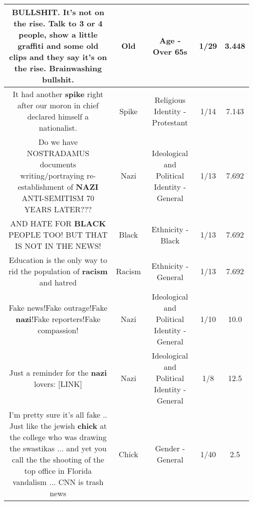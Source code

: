 \documentclass[11pt]{article}
\newlength\mylength
\begin{document}
\begin{center}
\begin{longtable}{|C{.65\mylength}|C{.30\mylength}|C{.12\mylength}|C{.12\mylength}|C{.12\mylength}|}
  \small BULLSHIT. It's not on the rise. Talk to 3 or 4 people, show a little graffiti and some \textbf{old} clips and they say it's on the rise. Brainwashing bullshit.\normalsize   & Old & Age - Over 65s & 1/29 & 3.448 \\  \hline
  \small It had another \textbf{spike} right after our moron in chief declared himself a nationalist.\normalsize   & Spike & Religious Identity - Protestant & 1/14 & 7.143 \\  \hline
  \small Do we have NOSTRADAMUS documents writing/portraying re-establishment of \textbf{NAZI} ANTI-SEMITISM 70 YEARS LATER???\normalsize   & Nazi &  Ideological and Political Identity - General & 1/13 & 7.692 \\  \hline
  \small AND HATE FOR \textbf{BLACK} PEOPLE TOO! BUT THAT IS NOT IN THE NEWS!\normalsize   & Black & Ethnicity - Black & 1/13 & 7.692 \\  \hline
  \small Education is the only way to rid the population of \textbf{racism} and hatred\normalsize   & Racism & Ethnicity - General & 1/13 & 7.692 \\  \hline
  \small Fake news!Fake outrage!Fake \textbf{nazi}!Fake reporters!Fake compassion!\normalsize   & Nazi &  Ideological and Political Identity - General & 1/10 & 10.0 \\  \hline
  \small Just a reminder for the \textbf{nazi} lovers:  [LINK] \normalsize   & Nazi &  Ideological and Political Identity - General & 1/8 & 12.5 \\  \hline
  \small I'm pretty sure it's all fake .. Just like the jewish \textbf{chick} at the college who was drawing the swastikas ... and yet you call the the shooting of the top office in Florida vandalism ... CNN is trash news\normalsize   & Chick & Gender - General & 1/40 & 2.5 \\  \hline

\end{longtable}
\end{center}
\end{document}
